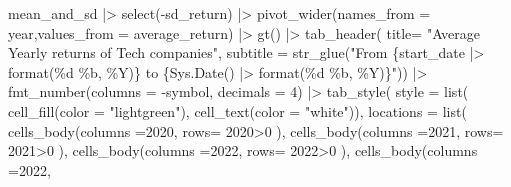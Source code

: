 \documentclass[
  letterpaper,
  DIV=11,
  numbers=noendperiod]{scrreprt}
\newenvironment{Shaded}{\begin{snugshade}}{\end{snugshade}}
\newcommand{\AttributeTok}[1]{\textcolor[rgb]{0.40,0.45,0.13}{#1}}
\newcommand{\DecValTok}[1]{\textcolor[rgb]{0.68,0.00,0.00}{#1}}
\newcommand{\FunctionTok}[1]{\textcolor[rgb]{0.28,0.35,0.67}{#1}}
\newcommand{\NormalTok}[1]{\textcolor[rgb]{0.00,0.23,0.31}{#1}}
\newcommand{\SpecialCharTok}[1]{\textcolor[rgb]{0.37,0.37,0.37}{#1}}
\newcommand{\StringTok}[1]{\textcolor[rgb]{0.13,0.47,0.30}{#1}}
\theoremstyle{definition}
\theoremstyle{remark}
\begin{document}
\begin{Shaded}
\begin{Highlighting}[]
\NormalTok{mean\_and\_sd }\SpecialCharTok{|\textgreater{}} 
  \FunctionTok{select}\NormalTok{(}\SpecialCharTok{{-}}\NormalTok{sd\_return) }\SpecialCharTok{|\textgreater{}} 
  \FunctionTok{pivot\_wider}\NormalTok{(}\AttributeTok{names\_from =}\NormalTok{ year,}\AttributeTok{values\_from =}\NormalTok{ average\_return) }\SpecialCharTok{|\textgreater{}} 
  \FunctionTok{gt}\NormalTok{() }\SpecialCharTok{|\textgreater{}} 
  \FunctionTok{tab\_header}\NormalTok{(}
    \AttributeTok{title=} \StringTok{"Average Yearly returns of Tech companies"}\NormalTok{,}
    \AttributeTok{subtitle  =} \FunctionTok{str\_glue}\NormalTok{(}\StringTok{"From \{start\_date |\textgreater{} format(\textquotesingle{}\%d \%b, \%Y\textquotesingle{})\} to \{Sys.Date() |\textgreater{} format(\textquotesingle{}\%d \%b, \%Y\textquotesingle{})\}"}\NormalTok{)) }\SpecialCharTok{|\textgreater{}} 
  \FunctionTok{fmt\_number}\NormalTok{(}\AttributeTok{columns =} \SpecialCharTok{{-}}\NormalTok{symbol, }\AttributeTok{decimals  =} \DecValTok{4}\NormalTok{) }\SpecialCharTok{|\textgreater{}} 
  \FunctionTok{tab\_style}\NormalTok{(}
    \AttributeTok{style =} \FunctionTok{list}\NormalTok{(}
      \FunctionTok{cell\_fill}\NormalTok{(}\AttributeTok{color =} \StringTok{"lightgreen"}\NormalTok{), }
      \FunctionTok{cell\_text}\NormalTok{(}\AttributeTok{color =} \StringTok{"white"}\NormalTok{)), }
    \AttributeTok{locations =} \FunctionTok{list}\NormalTok{(}
      \FunctionTok{cells\_body}\NormalTok{(}\AttributeTok{columns =}\StringTok{\textasciigrave{}}\AttributeTok{2020}\StringTok{\textasciigrave{}}\NormalTok{, }
                 \AttributeTok{rows=} \StringTok{\textasciigrave{}}\AttributeTok{2020}\StringTok{\textasciigrave{}}\SpecialCharTok{\textgreater{}}\DecValTok{0}\NormalTok{ ), }
      \FunctionTok{cells\_body}\NormalTok{(}\AttributeTok{columns =}\StringTok{\textasciigrave{}}\AttributeTok{2021}\StringTok{\textasciigrave{}}\NormalTok{, }
                 \AttributeTok{rows=} \StringTok{\textasciigrave{}}\AttributeTok{2021}\StringTok{\textasciigrave{}}\SpecialCharTok{\textgreater{}}\DecValTok{0}\NormalTok{ ), }
       \FunctionTok{cells\_body}\NormalTok{(}\AttributeTok{columns =}\StringTok{\textasciigrave{}}\AttributeTok{2022}\StringTok{\textasciigrave{}}\NormalTok{, }
                 \AttributeTok{rows=} \StringTok{\textasciigrave{}}\AttributeTok{2022}\StringTok{\textasciigrave{}}\SpecialCharTok{\textgreater{}}\DecValTok{0}\NormalTok{ ), }
       \FunctionTok{cells\_body}\NormalTok{(}\AttributeTok{columns =}\StringTok{\textasciigrave{}}\AttributeTok{2022}\StringTok{\textasciigrave{}}\NormalTok{, }

\end{Highlighting}
\end{Shaded}
\end{document}
